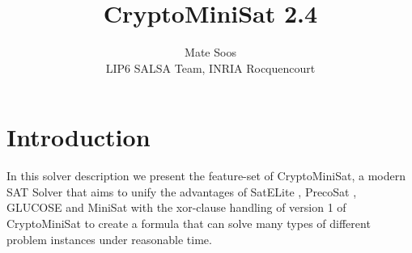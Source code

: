 \documentclass[final]{ieee}
\begin{document}

\title{CryptoMiniSat 2.4}
\author{Mate Soos\\LIP6 SALSA Team, INRIA Rocquencourt}

\maketitle
\thispagestyle{empty}
\pagestyle{empty}


\section{Introduction}

In this solver description we present the feature-set of CryptoMiniSat, a modern SAT Solver that aims to unify the advantages of SatELite \cite{DBLP:conf/sat/EenB05}, PrecoSat \cite{precosat}, GLUCOSE \cite{glucose} and MiniSat \cite{EenS03MiniSat} with the xor-clause handling of version 1 of CryptoMiniSat \cite{DBLP:conf/sat/SoosNC09} to create a formula that can solve many types of different problem instances under reasonable time.

\end{document}

